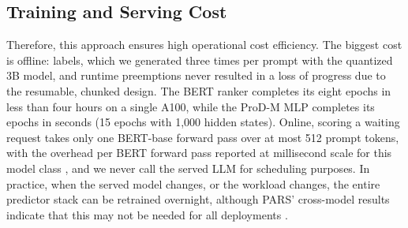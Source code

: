 \documentclass[conference]{IEEEtran}
\begin{document}
\subsection{Training and Serving Cost}
Therefore, this approach ensures high operational cost efficiency. The biggest cost is offline: labels, which we generated three times per prompt with the quantized 3B model, and runtime preemptions never resulted in a loss of progress due to the resumable, chunked design. The BERT ranker completes its eight epochs in less than four hours on a single A100, while the ProD-M MLP completes its epochs in seconds (15 epochs with 1,000 hidden states). Online, scoring a waiting request takes only one BERT-base forward pass over at most 512 prompt tokens, with the overhead per BERT forward pass reported at millisecond scale for this model class \cite{xie2026egtp}, and we never call the served LLM for scheduling purposes. In practice, when the served model changes, or the workload changes, the entire predictor stack can be retrained overnight, although PARS' cross-model results indicate that this may not be needed for all deployments \cite{tao2025pars}.

\clearpage
\end{document}
